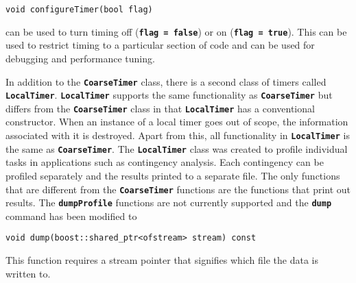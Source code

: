 {
\color{red}
\begin{Verbatim}[fontseries=b]
void configureTimer(bool flag)
\end{Verbatim}
}

can be used to turn timing off (\texttt{\textbf{flag = false}}) or on (\texttt{\textbf{flag = true}}). This can be used to restrict timing to a particular section of code and can be used for debugging and performance tuning.

In addition to the \texttt{\textbf{CoarseTimer}} class, there is a second class of timers called \texttt{\textbf{LocalTimer}}. \texttt{\textbf{LocalTimer}} supports the same functionality as \texttt{\textbf{CoarseTimer}} but differs from the \texttt{\textbf{CoarseTimer}} class in that \texttt{\textbf{LocalTimer}} has a conventional constructor. When an instance of a local timer goes out of scope, the information associated with it is destroyed. Apart from this, all functionality in \texttt{\textbf{LocalTimer}} is the same as \texttt{\textbf{CoarseTimer}}. The \texttt{\textbf{LocalTimer}} class was created to profile individual tasks in applications such as contingency analysis. Each contingency can be profiled separately and the results printed to a separate file. The only functions that are different from the \texttt{\textbf{CoarseTimer}} functions are the functions that print out results. The \texttt{\textbf{dumpProfile}} functions are not currently supported and the \texttt{\textbf{dump}} command has been modified to

{
\color{red}
\begin{Verbatim}[fontseries=b]
void dump(boost::shared_ptr<ofstream> stream) const
\end{Verbatim}
}

This function requires a stream pointer that signifies which file the data is written to.
